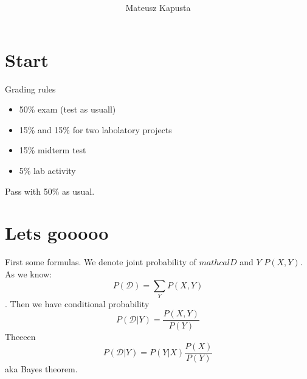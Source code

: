 \documentclass[12pt,a4paper]{article}
\title{\huge \bf \Title\\}
\author{Mateusz Kapusta}
\begin{document}
\maketitle
\section{Start}
Grading rules
\begin{itemize}
    \item 50\% exam (test as usuall)
    \item 15\% and 15\% for two labolatory projects
    \item 15\% midterm test
    \item 5\% lab activity
\end{itemize}
Pass with 50\% as usual.

\section{Lets gooooo}
First some formulas. We denote joint probability of  $mathcal{D}$ and $Y$ $P(X,Y)$. As we know:
\begin{equation}
    P(\mathcal{D})=\sum_{Y}P(X,Y)
\end{equation}
. Then we have conditional probability 
\begin{equation}
    P(\mathcal{D}|Y)=\frac{P(X,Y)}{P(Y)}
\end{equation}
Theeeen
\begin{equation}\label{bayes}
    P(\mathcal{D}|Y)=P(Y|X)\frac{P(X)}{P(Y)}
\end{equation}
aka Bayes theorem.
\end{document}
